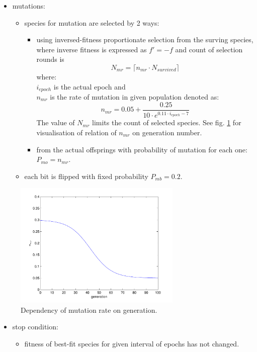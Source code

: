 \documentclass[a4paper]{IEEEtran}
\begin{document}
\begin{itemize}
	\item mutations:
	\begin{itemize}
		\item species for mutation are selected by 2 ways:
		\begin{itemize}
			\item using inversed-fitness proportionate
			selection from the surving species, where inverse fitness is expressed as
			$ f'=-f  $
			and count of selection rounds is
			\[ N_{mr} = \lceil n_{mr}\cdot N_{survived} \rceil \]
			where:\\
			$ i_{epoch} $ is the actual epoch and\\
			$ n_{mr} $  is the rate of mutation in given population denoted as:			
			\[ n_{mr} = 0.05+\dfrac{0.25}{10\cdot e^{0.11\cdot i_{epoch}-7}}\]
			The value of $ N_{mr} $ limits the count of selected species. 
			See fig. \ref{mut_r} for visualisation of relation of $ n_{mr} $ 
			on generation number.
			\item from the actual offsprings with probability of mutation for each one:
			$ P_{mo} = n_{mr} $.
		\end{itemize}
		\item each bit is flipped with fixed probability
		$ P_{mb} = 0.2 $.
	\end{itemize}
\end{itemize}
\begin{figure}[h]
	\centering
	\includegraphics[width=80mm]{mut_r}
	\caption{Dependency of mutation rate on generation.}
	\label{mut_r}
\end{figure}
\begin{itemize}
	\item stop condition:
	\begin{itemize}
		\item fitness of best-fit species for given interval of epochs has not changed.
	\end{itemize}	
\end{itemize}
\end{document}
